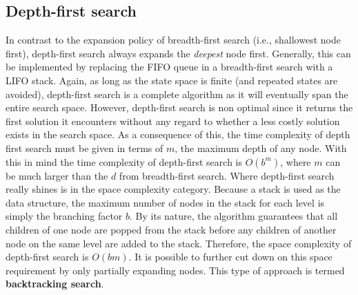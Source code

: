 \documentclass[a4paper,11pt]{report}
\begin{document}
\subsection{Depth-first search}
In contrast to the expansion policy of breadth-first search (i.e., shallowest
node first), depth-first search always expands the \textit{deepest} node first.
Generally, this can be implemented by replacing the FIFO queue in a 
breadth-first search with a LIFO stack.\cite{norvig}  Again, as long as the
state space is finite (and repeated states are avoided), depth-first search is
a complete algorithm as it will eventually span the entire search
space.\cite{norvig} However, depth-first search is non optimal since it returns
the first solution it encounters without any regard to whether a less
costly solution exists in the search space. As a consequence of this, the time
complexity of depth first search must be given in terms of $m$, the
maximum depth of any node.  With this in mind the time complexity of depth-first
search is $O(b^m)$, where $m$ can be much larger than the $d$ from
breadth-first search.\cite{norvig} Where depth-first search really shines is in
the space complexity category.  Because a stack is used as the data structure,
the maximum number of nodes in the stack for each level is simply the branching
factor $b$.  By its nature, the algorithm guarantees that all children
of one node are popped from the stack before any children of another node on
the same level are added to the stack.  Therefore, the space complexity of 
depth-first search is $O(bm)$.  It is possible to further cut down on this 
space requirement by only partially expanding nodes.  This type of approach is
termed \textbf{backtracking search}.\cite{norvig} 
\end{document}
